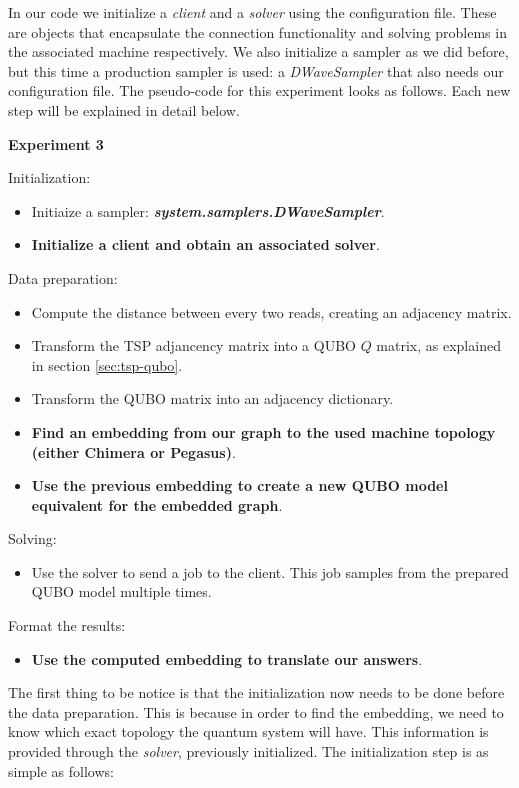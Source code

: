 In our code we initialize a \emph{client} and a \emph{solver} using the configuration file. These are objects that encapsulate the connection functionality and solving problems in the associated machine respectively. We also initialize a sampler as we did before, but this time a production sampler is used: a \emph{DWaveSampler} that also needs our configuration file. The pseudo-code for this experiment looks as follows. Each new step will be explained in detail below.

\begin{algorithm}
	\caption*{\textbf{Experiment 3}}
	
	Initialization:
	\begin{itemize}
		\item Initiaize a sampler: \textbf{\emph{system.samplers.DWaveSampler}}.
		\item \textbf{Initialize a client and obtain an associated solver}.
	\end{itemize}
	
	Data preparation:
	\begin{itemize}
		\item Compute the distance between every two reads, creating an adjacency matrix.
		\item Transform the TSP adjancency matrix into a QUBO $Q$ matrix, as explained in section \ref{sec:tsp-qubo}.
		\item Transform the QUBO matrix into an adjacency dictionary.
		\item \textbf{Find an embedding from our graph to the used machine topology (either Chimera or Pegasus)}.
		\item \textbf{Use the previous embedding to create a new QUBO model equivalent for the embedded graph}.
	\end{itemize}
	
	Solving:
	\begin{itemize}
		\item Use the solver to send a job to the client. This job samples from the prepared QUBO model multiple times.
	\end{itemize}
	
	Format the results:
	\begin{itemize}
		\item \textbf{Use the computed embedding to translate our answers}.
	\end{itemize}
\end{algorithm}

The first thing to be notice is that the initialization now needs to be done before the data preparation. This is because in order to find the embedding, we need to know which exact topology the quantum system will have. This information is provided through the \emph{solver}, previously initialized. The initialization step is as simple as follows:

